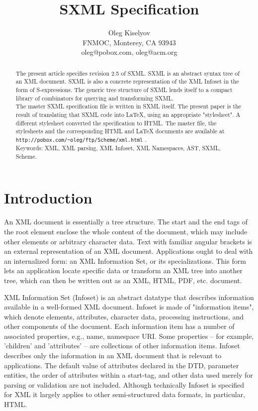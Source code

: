 \documentclass[10pt]{article}
\begin{document}
\title{SXML Specification}
\author{Oleg Kiselyov\\FNMOC, Monterey, CA 93943\\oleg@pobox.com, oleg@acm.org}
\maketitle
\begin{abstract}
The present article specifies revision 2.5 of SXML. SXML is an abstract syntax tree of an XML document. SXML is also
a concrete representation of the XML Infoset in the form of
S-expressions. The generic tree structure of SXML lends itself to a
compact library of combinators for querying and transforming SXML.\\The master SXML specification file is written in SXML itself. The present paper is the result of translating that SXML code into \LaTeX, using an appropriate "stylesheet". A different stylesheet converted the specification to HTML. The master file, the stylesheets and the corresponding HTML and \LaTeX{} documents are available at  \texttt{http://pobox.com/\textasciitilde{}oleg/ftp/Scheme/xml.html} .\\Keywords: XML, XML parsing, XML Infoset, XML Namespaces, AST, SXML, Scheme.\end{abstract}
\section{Introduction}
An XML document is essentially a tree structure. The start and the end
tags of the root element enclose the whole content of the document,
which may include other elements or arbitrary character data.  Text
with familiar angular brackets is an external representation of an XML
document. Applications ought to deal with an internalized form:
an XML Information Set, or its specializations.  This form lets an
application locate specific data or transform an XML tree into another
tree, which can then be written out as an XML, HTML, PDF, etc.
document.

XML Information Set (Infoset) \cite{XML Infoset} is an
abstract datatype that describes information available in a
well-formed XML document.  Infoset is made of "information items",
which denote elements, attributes, character data, processing
instructions, and other components of the document. Each information
item has a number of associated properties, e.g., name, namespace
URI. Some properties -- for example, 'children' and 'attributes' --
are collections of other information items. Infoset describes
only the information in an XML document that is relevant to
applications. The default value of attributes declared in the DTD, parameter
entities, the order of attributes within a start-tag, and other data used merely for parsing or validation are not included. Although technically 
Infoset is specified for XML it largely applies to other semi-structured data formats, in particular, HTML.
\end{document}
